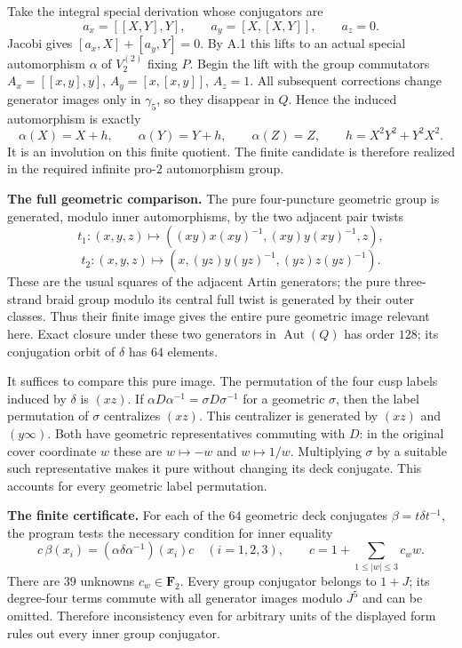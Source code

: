 \documentclass[10pt,a4paper]{article}
\begin{document}
Take the integral special derivation whose conjugators are \[
 a_x=[[X,Y],Y],\qquad a_y=[X,[X,Y]],\qquad a_z=0.
\] Jacobi gives \([a_x,X]+[a_y,Y]=0\). By A.1 this lifts to an actual special automorphism \(\alpha\) of \(V_2^{(2)}\) fixing \(P\). Begin the lift with the group commutators \(A_x=[[x,y],y]\), \(A_y=[x,[x,y]]\), \(A_z=1\). All subsequent corrections change generator images only in \(\gamma_5\), so they disappear in \(Q\). Hence the induced automorphism is exactly \[
 \alpha(X)=X+h,\qquad\alpha(Y)=Y+h,\qquad\alpha(Z)=Z,
 \qquad h=X^2Y^2+Y^2X^2.                              \tag{C.9}
\] It is an involution on this finite quotient. The finite candidate is therefore realized in the required infinite pro-\(2\) automorphism group.

\textbf{The full geometric comparison.} The pure four-puncture geometric group is generated, modulo inner automorphisms, by the two adjacent pair twists \[
 t_1:(x,y,z)\longmapsto
 ((xy)x(xy)^{-1},(xy)y(xy)^{-1},z),
\] \[
 t_2:(x,y,z)\longmapsto
 (x,(yz)y(yz)^{-1},(yz)z(yz)^{-1}).                    \tag{C.10}
\] These are the usual squares of the adjacent Artin generators; the pure three-strand braid group modulo its central full twist is generated by their outer classes. Thus their finite image gives the entire pure geometric image relevant here. Exact closure under these two generators in \(\operatorname{Aut}(Q)\) has order \(128\); its conjugation orbit of \(\delta\) has \(64\) elements.

It suffices to compare this pure image. The permutation of the four cusp labels induced by \(\delta\) is \((xz)\). If \(\alpha D\alpha^{-1}=\sigma D\sigma^{-1}\) for a geometric \(\sigma\), then the label permutation of \(\sigma\) centralizes \((xz)\). This centralizer is generated by \((xz)\) and \((y\infty)\). Both have geometric representatives commuting with \(D\): in the original cover coordinate \(w\) these are \(w\mapsto-w\) and \(w\mapsto1/w\). Multiplying \(\sigma\) by a suitable such representative makes it pure without changing its deck conjugate. This accounts for every geometric label permutation.

\textbf{The finite certificate.} For each of the \(64\) geometric deck conjugates \(\beta=t\delta t^{-1}\), the program tests the necessary condition for inner equality \[
 c\,\beta(x_i)=(\alpha\delta\alpha^{-1})(x_i)c
 \quad(i=1,2,3),\qquad
 c=1+\sum_{1\le |w|\le3}c_w w.                       \tag{C.11}
\] There are \(39\) unknowns \(c_w\in\mathbf F_2\). Every group conjugator belongs to \(1+J\); its degree-four terms commute with all generator images modulo \(J^5\) and can be omitted. Therefore inconsistency even for arbitrary units of the displayed form rules out every inner group conjugator.
\end{document}
